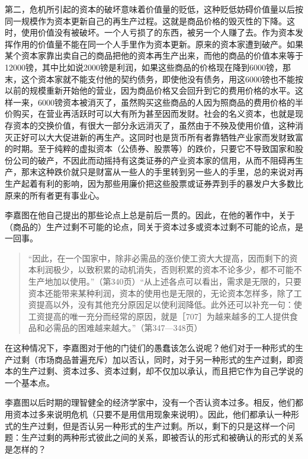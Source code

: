 第二，危机所引起的资本的破坏意味着价值量的贬低，这种贬低妨碍价值量以后按同一规模作为资本更新自己的再生产过程。这就是商品价格的毁灭性的下降。这时，使用价值没有被破坏。一个人亏损了的东西，被另一个人赚了去。作为资本发挥作用的价值量不能在同一个人手里作为资本更新。原来的资本家遭到破产。如果某个资本家靠出卖自己的商品把他的资本再生产出来，而他的商品的价值本来等于12000镑，其中比如说2000镑是利润，如果这些商品的价格现在降到6000镑，那末，这个资本家就不能支付他的契约债务，即使他没有债务，用这6000镑也不能按以前的规模重新开始他的营业，因为商品价格又会回升到它的费用价格的水平。这样一来，6000镑资本被消灭了，虽然购买这些商品的人因为照商品的费用价格的半价购买，在营业再活跃时可以大有所为甚至因而发财。社会的名义资本，也就是现存资本的交换价值，有很大一部分永远消灭了，虽然由于不殃及使用价值，这种消灭正好可以大大促进新的再生产。这同时也是货币所有者靠牺牲产业家而发财致富的时期。至于纯粹的虚拟资本（公债券、股票等）的跌价，只要它不导致国家和股份公司的破产，不因此而动摇持有这类证券的产业资本家的信用，从而不阻碍再生产，那末这种跌价就只是财富从一些人的手里转到另一些人的手里，总的来说对再生产起着有利的影响，因为那些用廉价把这些股票或证券弄到手的暴发户大多数比原来的所有者更有事业心。


李嘉图在他自己提出的那些论点上总是前后一贯的。因此，在他的著作中，关于（商品的）生产过剩不可能的论点，同关于资本过多或资本过剩不可能的论点，是一回事。

\begin{quote}{“因此，在一个国家中，除非必需品的涨价使工资大大提高，因而剩下的资本利润极少，以致积累的动机消失，否则积累的资本不论多少，都不可能不生产地加以使用。”（第340页）“从上述各点可以看出，需求是无限的，只要资本还能带来某种利润，资本的使用也是无限的，无论资本怎样多，除了工资提高以外，没有其他充分原因足以使利润降低。此外还可以补充一句：使工资提高的唯一充分而经常的原因，就是［707］为越来越多的工人提供食品和必需品的困难越来越大。”（第347—348页）}\end{quote}

在这种情况下，李嘉图对于他的门徒们的愚蠢该怎么说呢？他们对于一种形式的生产过剩（市场商品普遍充斥）加以否认，同时，对于另一种形式的生产过剩，即资本的生产过剩、资本过多、资本过剩，却不仅加以承认，而且把它作为自己学说的一个基本点。

李嘉图以后时期的理智健全的经济学家中，没有一个否认资本过多。相反，他们都用资本过多来说明危机（只要不是用信用现象来说明）。因此，他们都承认一种形式的生产过剩，但是否认另一种形式的生产过剩。所以，剩下的只是这样一个问题：生产过剩的两种形式彼此之间的关系，即被否认的形式和被确认的形式的关系是怎样的？

